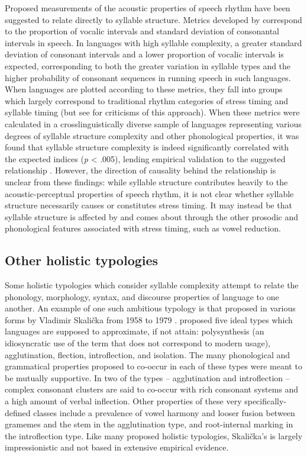   Proposed measurements of the acoustic properties of speech rhythm have been suggested to relate directly to syllable structure. Metrics developed by \citet{RamusEtAl1999} correspond to the proportion of vocalic intervals and standard deviation of consonantal intervals in speech. In languages with high syllable complexity, a greater standard deviation of consonant intervals and a lower proportion of vocalic intervals is expected, corresponding to both the greater variation in syllable types and the higher probability of consonant sequences in running speech in such languages. When languages are plotted according to these metrics, they fall into groups which largely correspond to traditional rhythm categories of stress timing and syllable timing (but see \citealt{WigetEtAl2010} for criticisms of this approach). When these metrics were calculated in a crosslinguistically diverse sample of languages representing various degrees of syllable structure complexity and other phonological properties, it was found that syllable structure complexity is indeed significantly correlated with the expected indices (\textit{p} < .005), lending empirical validation to the suggested relationship \citep{EasterdayEtAl2011}. However, the direction of causality behind the relationship is unclear from these findings: while syllable structure contributes heavily to the acoustic-perceptual properties of speech rhythm, it is not clear whether syllable structure necessarily causes or constitutes stress timing. It may instead be that syllable structure is affected by and comes about through the other prosodic and phonological features associated with stress timing, such as vowel reduction.

\subsection{Other holistic typologies}\label{sec:1.3.2}

 Some holistic typologies which consider syllable complexity attempt to relate the phonology, morphology, syntax, and discourse properties of language to one another. An example of one such ambitious typology is that proposed in various forms by Vladimir Skalička from 1958 to 1979 \citep{Plank1998}. \citet{Skalička1979} proposed five ideal types which languages are supposed to approximate, if not attain: polysynthesis (an idiosyncratic use of the term that does not correspond to modern usage), agglutination, flection, introflection, and isolation. The many phonological and grammatical properties proposed to co-occur in each of these types were meant to be mutually supportive. In two of the types -- agglutination and introflection -- complex consonant clusters are said to co-occur with rich consonant systems and a high amount of verbal inflection. Other properties of these very specifically-defined classes include a prevalence of vowel harmony and looser fusion between gramemes and the stem in the agglutination type, and root-internal marking in the introflection type. Like many proposed holistic typologies, Skalička’s is largely impressionistic and not based in extensive empirical evidence.

